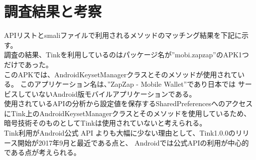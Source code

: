 \newpage
\section{調査結果と考察}

APIリストとsmaliファイルで利用されるメソッドのマッチング結果を下記に示す。\\
調査の結果、Tinkを利用しているのはパッケージ名が”mobi.zapzap”のAPK1つだけであった。
\\このAPKでは、AndroidKeysetManagerクラスとそのメソッドが使用されている。
このアプリケーション名は、”ZapZap - Mobile Wallet”\cite{ZapZap}であり日本では
サービスしていないAndroid版モバイルアプリケーションである。
\\使用されているAPIの分析から設定値を保存するSharedPreferencesへのアクセスにTink上のAndroidKeysetManagerクラスとそのメソッドを使用しているため、
暗号技術そのものとしてTinkは使用されていないと考えられる。
\\Tink利用がAndroid公式 API よりも大幅に少ない理由として、Tink1.0.0のリリース開始が2017年9月と最近である点と、
Androidでは公式APIの利用が中心的である点が考えられる。





